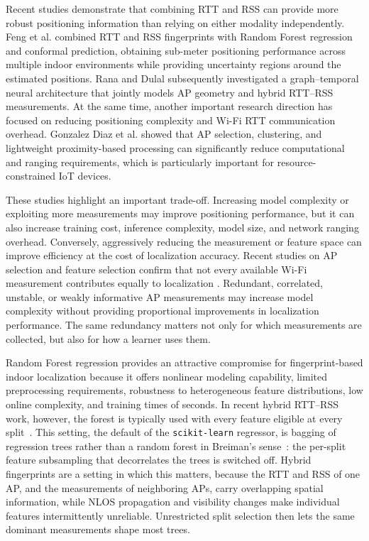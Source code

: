 Recent studies demonstrate that combining RTT and RSS can provide more robust positioning information than relying on either modality independently. Feng et al. \cite{feng2026robust} combined RTT and RSS fingerprints with Random Forest regression and conformal prediction, obtaining sub-meter positioning performance across multiple indoor environments while providing uncertainty regions around the estimated positions. Rana and Dulal \cite{rana2025gtcn} subsequently investigated a graph--temporal neural architecture that jointly models AP geometry and hybrid RTT--RSS measurements. At the same time, another important research direction has focused on reducing positioning complexity and Wi-Fi RTT communication overhead. Gonzalez Diaz et al. \cite{gonzalezdiaz2026scalable,gonzalezdiaz2024stdclustering} showed that AP selection, clustering, and lightweight proximity-based processing can significantly reduce computational and ranging requirements, which is particularly important for resource-constrained IoT devices.

These studies highlight an important trade-off. Increasing model complexity or exploiting more measurements may improve positioning performance, but it can also increase training cost, inference complexity, model size, and network ranging overhead. Conversely, aggressively reducing the measurement or feature space can improve efficiency at the cost of localization accuracy. Recent studies on AP selection and feature selection confirm that not every available Wi-Fi measurement contributes equally to localization \cite{wang2024gnnap,ayinla2026reloc}. Redundant, correlated, unstable, or weakly informative AP measurements may increase model complexity without providing proportional improvements in localization performance. The same redundancy matters not only for which measurements are collected, but also for how a learner uses them.

Random Forest regression provides an attractive compromise for fingerprint-based indoor localization because it offers nonlinear modeling capability, limited preprocessing requirements, robustness to heterogeneous feature distributions, low online complexity, and training times of seconds. In recent hybrid RTT--RSS work, however, the forest is typically used with every feature eligible at every split~\cite{feng2026robust}. This setting, the default of the \texttt{scikit-learn} regressor, is bagging of regression trees rather than a random forest in Breiman's sense~\cite{breiman2001random}: the per-split feature subsampling that decorrelates the trees is switched off. Hybrid fingerprints are a setting in which this matters, because the RTT and RSS of one AP, and the measurements of neighboring APs, carry overlapping spatial information, while NLOS propagation and visibility changes make individual features intermittently unreliable. Unrestricted split selection then lets the same dominant measurements shape most trees.

